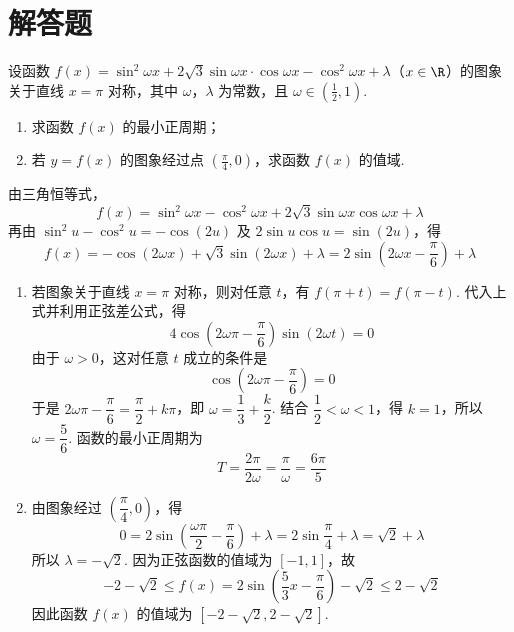 \section{解答题}

\begin{problem}
设函数 \( f(x) = \sin^2 \omega x + 2\sqrt{3}\sin \omega x \cdot \cos \omega x - \cos^2 \omega x + \lambda \)（\(x \in \R\)）的图象关于直线 \( x = \pi \) 对称，其中 \(\omega\)，\(\lambda\) 为常数，且 \( \omega \in \left(\frac{1}{2}, 1\right) \).
\begin{enumerate}
\item 求函数 \( f(x) \) 的最小正周期；
\item 若 \( y = f(x) \) 的图象经过点 \( \left(\frac{\pi}{4}, 0\right) \)，求函数 \( f(x) \) 的值域.
\end{enumerate}
\end{problem}

\begin{solution}
由三角恒等式，
\[
f(x)=\sin^{2}\omega x-\cos^{2}\omega x+2\sqrt3\sin\omega x\cos\omega x+\lambda
\]
再由 \(\sin^{2}u-\cos^{2}u=-\cos(2u)\) 及 \(2\sin u\cos u=\sin(2u)\)，得
\[
f(x)=-\cos(2\omega x)+\sqrt3\sin(2\omega x)+\lambda
    =2\sin\left(2\omega x-\frac\pi6\right)+\lambda
\]

\begin{enumerate}
\item 若图象关于直线 \(x=\pi\) 对称，则对任意 \(t\)，有 \(f(\pi+t)=f(\pi-t)\). 代入上式并利用正弦差公式，得
\[
4\cos\left(2\omega\pi-\frac\pi6\right)\sin(2\omega t)=0
\]
由于 \(\omega>0\)，这对任意 \(t\) 成立的条件是
\[
\cos\left(2\omega\pi-\frac\pi6\right)=0
\]
于是 \(2\omega\pi-\dfrac\pi6=\dfrac\pi2+k\pi\)，即 \(\omega=\dfrac13+\dfrac k2\). 结合 \(\dfrac12<\omega<1\)，得 \(k=1\)，所以 \(\omega=\dfrac56\). 函数的最小正周期为
\[
T=\frac{2\pi}{2\omega}=\frac\pi\omega=\frac{6\pi}{5}
\]

\item 由图象经过 \(\left(\dfrac\pi4,0\right)\)，得
\[
0=2\sin\left(\frac{\omega\pi}{2}-\frac\pi6\right)+\lambda
 =2\sin\frac\pi4+\lambda=\sqrt2+\lambda
\]
所以 \(\lambda=-\sqrt2\). 因为正弦函数的值域为 \([-1,1]\)，故
\[
-2-\sqrt2\leqslant f(x)=2\sin\left(\frac53x-\frac\pi6\right)-\sqrt2\leqslant2-\sqrt2
\]
因此函数 \(f(x)\) 的值域为 \([-2-\sqrt2,2-\sqrt2]\).
\end{enumerate}
\end{solution}

